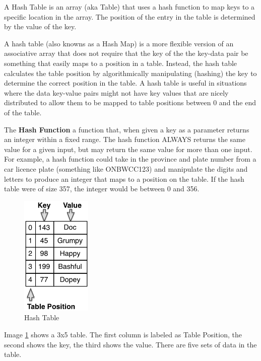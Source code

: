 A Hash Table is an array (aka Table) that uses a hash function to map keys to a specific location in the array.   The position of the entry in the table is determined by the value of the key.  
 
 A hash table (also knowns as a Hash Map)  is a more flexible version of an associative array that does not require that the key of the the key-data pair be something that easily maps to a position in a table.   Instead, the hash table calculates the table position by algorithmically manipulating (hashing) the key to determine the correct position in the table.   A hash table is useful in situations where the data key-value pairs might not have key values that are nicely distributed to allow them to be mapped to table positions between 0 and the end of the table.
 
 
The \textbf{Hash Function} a function that, when given a key as a parameter returns  an integer within a  fixed range.   The hash function ALWAYS returns the same value for a given input, but may return the same value for more than one input.   For example,  a hash function could take in the province and plate number from a car licence plate (something like ONBWCC123) and manipulate the digits and letters to produce an integer that maps to a position on the table.  If the hash table were of size 357, the integer would be between 0 and 356.  

\begin{figure}[H]
\centering
\includegraphics[width=0.3\textwidth]{pictures/Hash_Tables_0.png}
\caption{Hash Table}
\label{fig:hashTable}
\end{figure}

Image \ref{fig:hashTable} shows a 3x5 table.  The first column is labeled as Table Position, the second shows the key, the third shows the value.  There are five sets of data in the table.  

